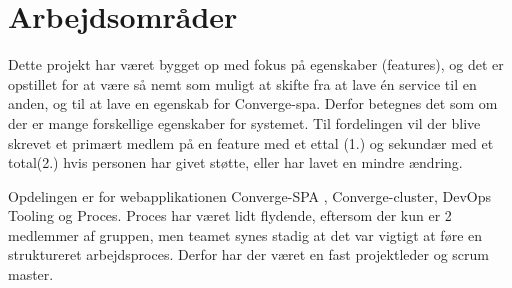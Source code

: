 \section{Arbejdsområder}

Dette projekt har været bygget op med fokus på egenskaber (features), og det er opstillet for at være så nemt som muligt at skifte fra at lave én service til en anden, og til at lave en egenskab for Converge-spa. Derfor betegnes det som om der er mange forskellige egenskaber for systemet. Til fordelingen vil der blive skrevet et primært medlem på en feature med et ettal (1.) og sekundær med et total(2.) hvis personen har givet støtte, eller har lavet en mindre ændring.

Opdelingen er for webapplikationen Converge-SPA \cite[SPA]{converge-terms}, Converge-cluster, DevOps Tooling og Proces. Proces har været lidt flydende, eftersom der kun er 2 medlemmer af gruppen, men teamet synes stadig at det var vigtigt at føre en struktureret arbejdsproces. Derfor har der været en fast projektleder og scrum master.


